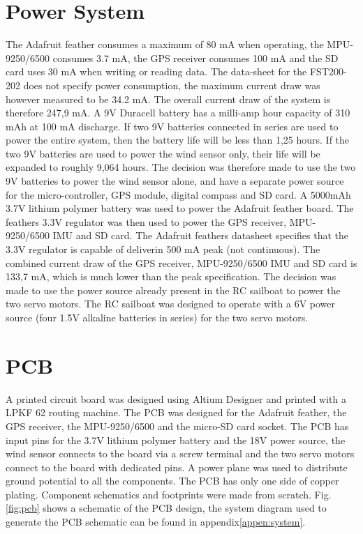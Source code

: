 \section{Power System}
The Adafruit feather consumes a maximum of 80 mA when operating, the MPU-9250/6500 consumes 3.7 mA, the GPS receiver consumes 100 mA and the SD card uses 30 mA when writing or reading data. The
data-sheet for the FST200-202 does not specify power consumption, the maximum current draw was however measured to be 34.2 mA. The overall current draw of the system is therefore 247,9 mA. A 
9V Duracell battery has a milli-amp hour capacity of 310 mAh at 100 mA discharge\cite{mah}. If two 9V batteries connected in series are used to power the entire system, then the battery life will 
be less than 1,25 hours. If the two 9V batteries are used to power the wind sensor only, their life will be expanded to roughly 9,064 hours. The decision was therefore made to use the two 9V batteries to power the 
wind sensor alone, and have a separate power source for the micro-controller, GPS module, digital compass and SD card. A 5000mAh 3.7V lithium polymer battery was used to power the Adafruit feather
board. The feathers 3.3V regulator was then used to power the GPS receiver, MPU-9250/6500 IMU and SD card. The Adafruit feathers datasheet specifies that the 3.3V regulator is capable of deliverin
500 mA peak (not continuous)\cite{feather}. The combined current draw of the GPS receiver, MPU-9250/6500 IMU and SD card is 133,7 mA, which is much lower than the peak specification. The decision was made
to use the power source already present in the RC sailboat to power the two servo motors. The RC sailboat was designed to operate with a 6V power source (four 1.5V
alkaline batteries in series) for the two servo motors.  

\section{PCB}
A printed circuit board was designed using Altium Designer and printed with a LPKF 62 routing machine. The PCB was designed for the Adafruit feather, the GPS receiver, the MPU-9250/6500 and the 
micro-SD card socket. The PCB has input pins for the 3.7V lithium polymer battery and the 18V power source, the wind sensor connects to the board via a screw terminal and the two servo motors
connect to the board with dedicated pins. A power plane was used to distribute ground potential to all the components. The PCB has only one side of copper plating. Component schematics and footprints
were made from scratch. Fig.\ref{fig:pcb} shows a schematic of the PCB design, the system diagram used to generate the PCB schematic can be found in appendix\ref{appen:system}.

